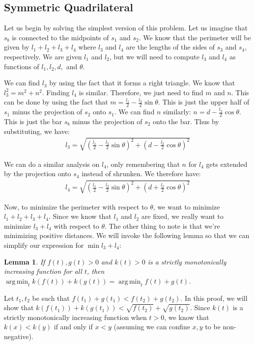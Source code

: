 \documentclass[12pt]{amsart}   %
\newtheorem{lemma}[theorem]{Lemma}
\DeclareMathOperator*{\argmin}{arg\,min}
\begin{document}
\subsection{Symmetric Quadrilateral}

Let us begin by solving the simplest version of this problem. Let us imagine that $s_b$ is connected to the midpoints of $s_1$ and $s_2$. We know that the perimeter will be given by $l_1 + l_2 + l_3 + l_4$ where $l_3$ and $l_4$ are the lengths of the sides of $s_3$ and $s_4$, respectively. We are given $l_1$ and $l_2$, but we will need to compute $l_3$ and $l_4$ as functions of $l_1, l_2,d, $ and $\theta$. 

We can find $l_3$ by using the fact that it forms a right triangle. We know that $l_3^2 = m^2 + n^2$. Finding $l_4$ is similar. Therefore, we just need to find $m$ and $n$. This can be done by using the fact that $m = \frac{l_1}{2} - \frac{l_2}{2} \sin \theta$. This is just the upper half of $s_1$ minus the projection of $s_2$ onto $s_1$. We can find $n$ similarly: $n = d - \frac{l_2}{2} \cos \theta$. This is just the bar $s_b$ minus the projection of $s_2$ onto the bar. Thus by substituting, we have:
\begin{eqnarray}
  l_3 = \sqrt{ \left(\frac{l_1}{2} - \frac{l_2}{2} \sin \theta \right)^2 + \left( d - \frac{l_2}{2} \cos \theta \right)^2 }
\end{eqnarray}

We can do a similar analysis on $l_4$, only remembering that $n$ for $l_4$ gets extended by the projection onto $s_4$ instead of shrunken. We therefore have:
\begin{eqnarray}
  l_4 = \sqrt{ \left(\frac{l_1}{2} - \frac{l_2}{2} \sin \theta \right)^2 + \left( d + \frac{l_2}{2} \cos \theta \right)^2 }
\end{eqnarray}

Now, to minimize the perimeter with respect to $\theta$, we want to minimize $l_1 + l_2 + l_3 + l_4$. Since we know that $l_1$ and $l_2$ are fixed, we really want to minimize $l_3 + l_4$ with respect to $\theta$. The other thing to note is that we're minimizing positive distances. We will invoke the following lemma so that we can simplify our expression for $\min l_3 + l_4$:

\begin{lemma}
  If $f(t), g(t) > 0$ and $k(t) > 0$ is a strictly monotonically increasing function for all $t$, then $\argmin_t k(f(t)) + k(g(t)) = \argmin_t f(t) + g(t)$.
  \label{lemma:minsqrt}
\end{lemma}
\proof Let $t_1, t_2$ be such that $f(t_1) + g(t_1) < f(t_2) + g(t_2)$. In this proof, we will show that $k(f(t_1)) + k(g(t_1)) < \sqrt{f(t_2)} + \sqrt{g(t_2)}$. Since $k(t)$ is a strictly monotonically increasing function when $t > 0$, we know that $k(x) < k(y)$ if and only if $x < y$ (assuming we can confine $x, y$ to be non-negative).
\end{document}
